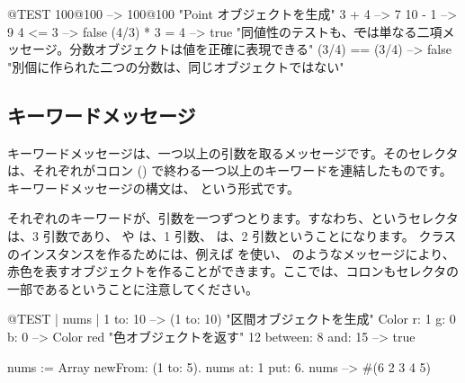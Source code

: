 \documentclass[a4paper,10pt,twoside]{book}
\begin{document}
\begin{code}{@TEST}
100@100      --> 100@100  "Point オブジェクトを生成"
3 + 4              --> 7
10 - 1            --> 9
4 <= 3            --> false
(4/3) * 3 = 4   --> true  "同値性のテストも、\st では単なる二項メッセージ。分数オブジェクトは値を正確に表現できる"
(3/4) == (3/4) --> false  "別個に作られた二つの分数は、同じオブジェクトではない"
\end{code}


\subsection{キーワードメッセージ}

キーワードメッセージは、一つ以上の引数を取るメッセージです。そのセレクタは、それぞれがコロン (\ct{:}) で終わる一つ以上のキーワードを連結したものです。キーワードメッセージの構文は、
という形式です。

それぞれのキーワードが、引数を一つずつとります。すなわち、というセレクタは、3 引数であり、 や  は、1 引数、 は、2 引数ということになります。 クラスのインスタンスを作るためには、例えば  を使い、 のようなメッセージにより、赤色を表すオブジェクトを作ることができます。ここでは、コロンもセレクタの一部であるということに注意してください。


\begin{code}{@TEST | nums |}
1 to: 10                        --> (1 to: 10)  "区間オブジェクトを生成"
Color r: 1 g: 0 b: 0       --> Color red  "色オブジェクトを返す"
12 between: 8 and: 15 --> true

nums := Array newFrom: (1 to: 5).
nums at: 1 put: 6.
nums --> #(6 2 3 4 5)
\end{code}
\end{document}
